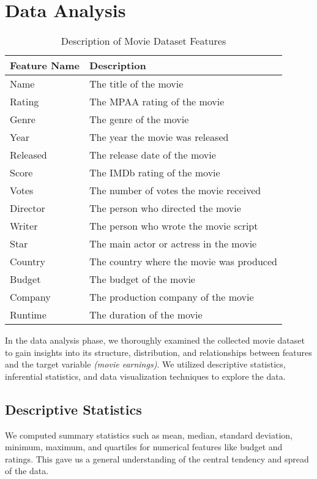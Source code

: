 \documentclass[conference]{IEEEtran}
\begin{document}
\section{Data Analysis}
   \begin{table}[h]
    \centering
    \captionsetup{justification=centering}
    \caption{Description of Movie Dataset Features}
    \label{tab:movie_dataset_features}
    \renewcommand{\arraystretch}{1.5}
    \begin{tabular}{>{\centering\arraybackslash}m{1cm} >{\centering\arraybackslash}m{6cm}}
        \toprule
        \textbf{Feature Name} & \textbf{Description} \\
        \midrule
        Name & The title of the movie \\
        Rating & The MPAA rating of the movie \\
        Genre & The genre of the movie \\
        Year & The year the movie was released \\
        Released & The release date of the movie \\
        Score & The IMDb rating of the movie \\
        Votes & The number of votes the movie received \\
        Director & The person who directed the movie \\
        Writer & The person who wrote the movie script \\
        Star & The main actor or actress in the movie \\
        Country & The country where the movie was produced \\
        Budget & The budget of the movie \\
        Company & The production company of the movie \\
        Runtime & The duration of the movie \\
        \bottomrule
    \end{tabular}
\end{table}

    In the data analysis phase, we thoroughly examined the collected movie dataset to gain insights into its structure, distribution, and relationships between features and the target variable \textit{(movie earnings)}. We utilized descriptive statistics, inferential statistics, and data visualization techniques to explore the data.

    \subsection{Descriptive Statistics}
        We computed summary statistics such as mean, median, standard deviation, minimum, maximum, and quartiles for numerical features like budget and ratings. This gave us a general understanding of the central tendency and spread of the data.
\end{document}
